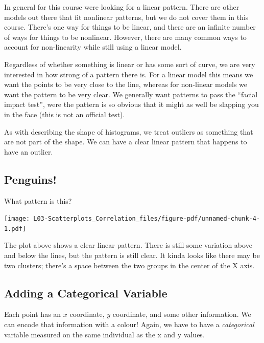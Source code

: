 \documentclass[
  letterpaper,
  DIV=11,
  numbers=noendperiod,
  oneside]{scrreprt}
\begin{document}
In general for this course were looking for a linear pattern. There are
other models out there that fit nonlinear patterns, but we do not cover
them in this course. There's one way for things to be linear, and there
are an infinite number of ways for things to be nonlinear. However,
there are many common ways to account for non-linearity while still
using a linear model.

Regardless of whether something is linear or has some sort of curve, we
are very interested in how strong of a pattern there is. For a linear
model this means we want the points to be very close to the line,
whereas for non-linear models we want the pattern to be very clear. We
generally want patterns to pass the ``facial impact test'', were the
pattern is so obvious that it might as well be slapping you in the face
(this is not an official test).

As with describing the shape of histograms, we treat outliers as
something that are not part of the shape. We can have a clear linear
pattern that happens to have an outlier.

\hypertarget{penguins}{%
\subsection{Penguins!}\label{penguins}}

\vspace{1cm}

What pattern is this?

\texttt{[image: L03-Scatterplots\_Correlation\_files/figure-pdf/unnamed-chunk-4-1.pdf]}

The plot above shows a clear linear pattern. There is still some
variation above and below the lines, but the pattern is still clear. It
kinda looks like there may be two clusters; there's a space between the
two groups in the center of the X axis.

\hypertarget{adding-a-categorical-variable}{%
\subsection{Adding a Categorical
Variable}\label{adding-a-categorical-variable}}

\vspace{1cm}

Each point has an \(x\) coordinate, \(y\) coordinate, and some other
information. We can encode that information with a colour! Again, we
have to have a \emph{categorical} variable measured on the same
individual as the x and y values.
\end{document}
